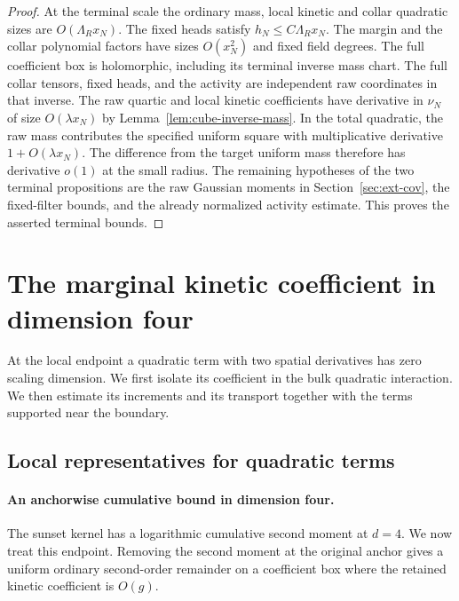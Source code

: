 \documentclass[11pt]{article}
\theoremstyle{definition}
\begin{document}
\begin{proof}
At the terminal scale the ordinary mass, local kinetic and
collar quadratic sizes are \(O(\Lambda_R x_N)\).
The fixed heads satisfy
\(h_N\le C\Lambda_R x_N\). The margin and the collar polynomial
factors have sizes \(O(x_N^2)\) and fixed field degrees.
The full coefficient box is holomorphic, including its terminal
inverse mass chart. The full collar tensors, fixed heads,
and the activity are independent raw coordinates in that inverse.
The raw quartic and local kinetic coefficients have derivative in
\(\nu_N\) of size \(O(\lambda x_N)\) by
Lemma~\ref{lem:cube-inverse-mass}. In the total quadratic, the
raw mass contributes the specified uniform square with multiplicative
derivative \(1+O(\lambda x_N)\). The difference from the target
uniform mass therefore has derivative \(o(1)\) at the small radius.
The remaining hypotheses of the two terminal propositions are the
raw Gaussian moments in Section~\ref{sec:ext-cov}, the fixed-filter
bounds, and the already normalized activity estimate. This proves
the asserted terminal bounds.
\end{proof}

\section{The marginal kinetic coefficient in dimension four}
\label{sec:four-dimensional-flow}

At the local endpoint a quadratic term with two spatial derivatives has
zero scaling dimension. We first isolate its coefficient in the bulk
quadratic interaction. We then estimate its increments and its transport
together with the terms supported near the boundary.

\subsection{Local representatives for quadratic terms}

\paragraph{An anchorwise cumulative bound in dimension four.}
The sunset kernel has a logarithmic cumulative second moment
at \(d=4\). We now treat this endpoint. Removing the second
moment at the original anchor gives a uniform ordinary
second-order remainder on a coefficient box where the retained
kinetic coefficient is \(O(g)\).
\end{document}

